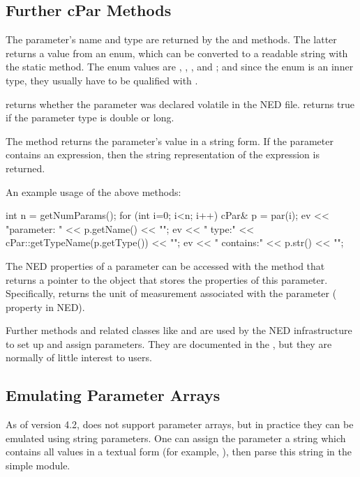 \subsection{Further cPar Methods}

The parameter's name and type are returned by the  and
 methods. The latter returns a value from an enum,
which can be converted to a readable string with the 
static method. The enum values are , , ,
 and ; and since the enum is an inner type,
they usually have to be qualified with .

 returns whether the parameter was declared volatile
in the NED file.  returns true if the parameter
type is double or long.

The  method returns the parameter's value in a string form.
If the parameter contains an expression, then the string representation
of the expression is returned.

An example usage of the above methods:

\begin{cpp}
int n = getNumParams();
for (int i=0; i<n; i++)
{
    cPar& p = par(i);
    ev << "parameter: " << p.getName() << "\n";
    ev << "  type:" << cPar::getTypeName(p.getType()) << "\n";
    ev << "  contains:" << p.str() << "\n";
}
\end{cpp}

The NED properties of a parameter can be accessed with the 
method that returns a pointer to the  object that stores
the properties of this parameter. Specifically,  returns
the unit of measurement associated with the parameter ( property in NED).

Further  methods and related classes like  and
 are used by the NED infrastructure to set up and
assign parameters. They are documented in the , but
they are normally of little interest to users.


\subsection{Emulating Parameter Arrays}

As of version 4.2, {\opp} does not support parameter arrays,
but in practice they can be emulated using string parameters.
One can assign the parameter a string which contains all values
in a textual form (for example, ), then
parse this string in the simple module.

